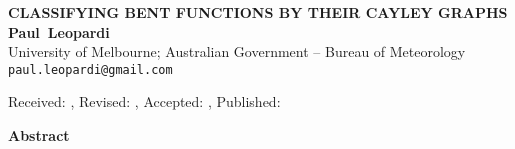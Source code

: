 \documentclass[10pt]{article}
\begin{document}
\begin{center}
\uppercase{\bf Classifying bent functions by their Cayley graphs}
\vskip 20pt
{\bf Paul~Leopardi}\\
{\smallit University of Melbourne; Australian Government -- Bureau of Meteorology}\\
{\tt paul.leopardi@gmail.com}
\end{center}
\vskip 30pt

\centerline{\smallit Received: , Revised: , Accepted: , Published: } %
\vskip 30pt

\centerline{\bf Abstract}

\noindent


\pagestyle{myheadings}
\thispagestyle{empty}
\baselineskip=12.875pt
\vskip 30pt


\end{document}
